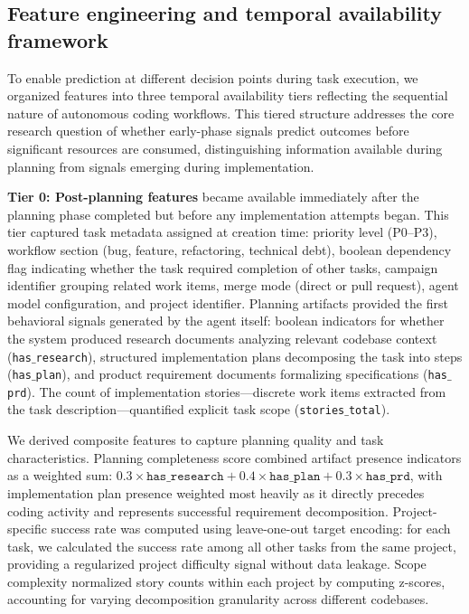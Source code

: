 \documentclass[]{article}
\begin{document}
\subsection{Feature engineering and temporal availability framework}

To enable prediction at different decision points during task execution, we organized features into three temporal availability tiers reflecting the sequential nature of autonomous coding workflows. This tiered structure addresses the core research question of whether early-phase signals predict outcomes before significant resources are consumed, distinguishing information available during planning from signals emerging during implementation.

\textbf{Tier 0: Post-planning features} became available immediately after the planning phase completed but before any implementation attempts began. This tier captured task metadata assigned at creation time: priority level (P0--P3), workflow section (bug, feature, refactoring, technical debt), boolean dependency flag indicating whether the task required completion of other tasks, campaign identifier grouping related work items, merge mode (direct or pull request), agent model configuration, and project identifier. Planning artifacts provided the first behavioral signals generated by the agent itself: boolean indicators for whether the system produced research documents analyzing relevant codebase context (\texttt{has\ensuremath{\_}research}), structured implementation plans decomposing the task into steps (\texttt{has\ensuremath{\_}plan}), and product requirement documents formalizing specifications (\texttt{has\ensuremath{\_}prd}). The count of implementation stories—discrete work items extracted from the task description—quantified explicit task scope (\texttt{stories\ensuremath{\_}total}).

We derived composite features to capture planning quality and task characteristics. Planning completeness score combined artifact presence indicators as a weighted sum: $0.3 \times \texttt{has\_research} + 0.4 \times \texttt{has\_plan} + 0.3 \times \texttt{has\_prd}$, with implementation plan presence weighted most heavily as it directly precedes coding activity and represents successful requirement decomposition. Project-specific success rate was computed using leave-one-out target encoding: for each task, we calculated the success rate among all other tasks from the same project, providing a regularized project difficulty signal without data leakage. Scope complexity normalized story counts within each project by computing z-scores, accounting for varying decomposition granularity across different codebases.
\end{document}
